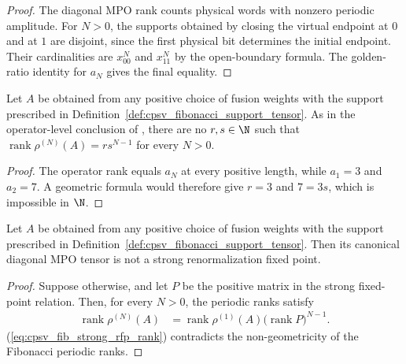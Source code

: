 \begin{proof}
    \leanok
    The diagonal MPO rank counts physical words with nonzero periodic amplitude.
    For $N>0$, the supports obtained by closing the virtual endpoint at $0$ and
    at $1$ are disjoint, since the first physical bit determines the initial
    endpoint. Their cardinalities are $x^N_{00}$ and $x^N_{11}$ by the
    open-boundary formula. The golden-ratio identity for $a_N$ gives the final
    equality.
\end{proof}

\begin{lemma}
    \label{thm:cpsv_fibonacci_operator_rank_not_geometric}
    \leanok
    Let $A$ be obtained from any positive choice of fusion weights with the
    support prescribed in Definition~\ref{def:cpsv_fibonacci_support_tensor}.
    As in the operator-level conclusion of
    \cite[Appendix~D, line~2125]{Cirac2016MPDO_arXiv}, there are no $r,s\in\N$
    such that $\operatorname{rank}\rho^{(N)}(A)=rs^{N-1}$ for every $N>0$.
\end{lemma}

\begin{proof}
    \leanok
    The operator rank equals $a_N$ at every positive length, while
    $a_1=3$ and $a_2=7$. A geometric formula would therefore give $r=3$ and
    $7=3s$, which is impossible in $\N$.
\end{proof}

\begin{lemma}
    \label{thm:cpsv_fibonacci_not_strong_rfp}
    \leanok
    Let $A$ be obtained from any positive choice of fusion weights with the
    support prescribed in Definition~\ref{def:cpsv_fibonacci_support_tensor}.
    Then its canonical diagonal MPO tensor is not a strong renormalization
    fixed point.
\end{lemma}

\begin{proof}
    \leanok
    Suppose otherwise, and let $P$ be the positive matrix in the strong
    fixed-point relation. Then, for every $N>0$, the periodic ranks satisfy
    \begin{align}
        \operatorname{rank}\rho^{(N)}(A)
         & =\operatorname{rank}\rho^{(1)}(A)
        \bigl(\operatorname{rank}P\bigr)^{N-1}.
        \label{eq:cpsv_fib_strong_rfp_rank}
    \end{align}
    (\ref{eq:cpsv_fib_strong_rfp_rank}) contradicts the
    non-geometricity of the Fibonacci periodic ranks.
\end{proof}

